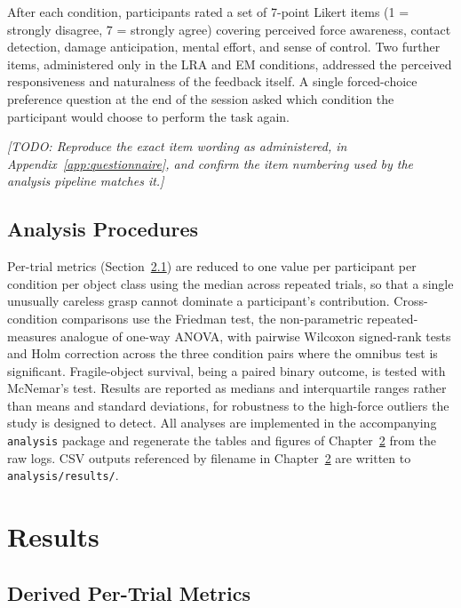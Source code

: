 \documentclass[12pt, a4paper, twoside, openright]{report}
\newcommand{\todo}[1]{\textit{[TODO: #1]}}
\begin{document}
After each condition, participants rated a set of 7-point Likert items
(1 = strongly disagree, 7 = strongly agree) covering perceived force awareness,
contact detection, damage anticipation, mental effort, and sense of control.
Two further items, administered only in the LRA and EM conditions, addressed the
perceived responsiveness and naturalness of the feedback itself. A single
forced-choice preference question at the end of the session asked which
condition the participant would choose to perform the task again.

\todo{Reproduce the exact item wording as administered, in
    Appendix~\ref{app:questionnaire}, and confirm the item numbering used by the
    analysis pipeline matches it.}

\section{Analysis Procedures}
\label{sec:analysis-procedures}

Per-trial metrics (Section~\ref{sec:metrics}) are reduced to one value per
participant per condition per object class using the median across repeated
trials, so that a single unusually careless grasp cannot dominate a
participant's contribution. Cross-condition comparisons use the Friedman test,
the non-parametric repeated-measures analogue of one-way ANOVA, with pairwise
Wilcoxon signed-rank tests and Holm correction across the three condition pairs
where the omnibus test is significant. Fragile-object survival, being a paired
binary outcome, is tested with McNemar's test. Results are reported as medians
and interquartile ranges rather than means and standard deviations, for
robustness to the high-force outliers the study is designed to detect. All
analyses are implemented in the accompanying \texttt{analysis} package and
regenerate the tables and figures of Chapter~\ref{ch:results} from the raw logs.
CSV outputs referenced by filename in Chapter~\ref{ch:results} are written to
\texttt{analysis/results/}.

\chapter{Results}
\label{ch:results}

\section{Derived Per-Trial Metrics}
\label{sec:metrics}
\end{document}
